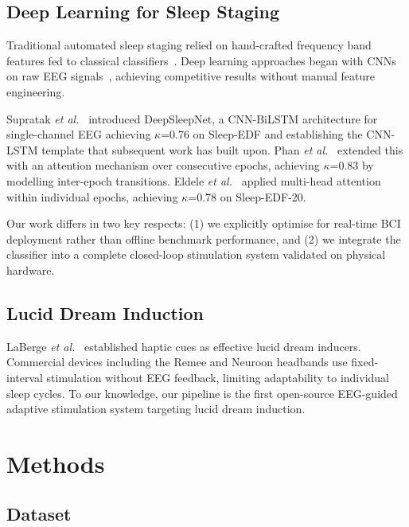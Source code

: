 \documentclass[journal]{IEEEtran}
\begin{document}
\subsection{Deep Learning for Sleep Staging}

Traditional automated sleep staging relied on
hand-crafted frequency band features fed to classical
classifiers~\cite{rechtschaffen1968}.
Deep learning approaches began with CNNs on raw
EEG signals~\cite{tsinalis2016}, achieving competitive
results without manual feature engineering.

Supratak \emph{et al.}~\cite{supratak2017} introduced
DeepSleepNet, a CNN-BiLSTM architecture for
single-channel EEG achieving $\kappa$=0.76 on
Sleep-EDF and establishing the CNN-LSTM template
that subsequent work has built upon.
Phan \emph{et al.}~\cite{phan2019} extended this with
an attention mechanism over consecutive epochs,
achieving $\kappa$=0.83 by modelling inter-epoch
transitions.
Eldele \emph{et al.}~\cite{eldele2021} applied
multi-head attention within individual epochs,
achieving $\kappa$=0.78 on Sleep-EDF-20.

Our work differs in two key respects:
(1) we explicitly optimise for real-time BCI deployment
rather than offline benchmark performance, and
(2) we integrate the classifier into a complete
closed-loop stimulation system validated on
physical hardware.

\subsection{Lucid Dream Induction}

LaBerge \emph{et al.}~\cite{laberge2018} established
haptic cues as effective lucid dream inducers.
Commercial devices including the Remee and Neuroon
headbands use fixed-interval stimulation without EEG
feedback, limiting adaptability to individual sleep
cycles.
To our knowledge, our pipeline is the first
open-source EEG-guided adaptive stimulation system
targeting lucid dream induction.

\section{Methods}
\label{sec:methods}

\subsection{Dataset}
\end{document}
